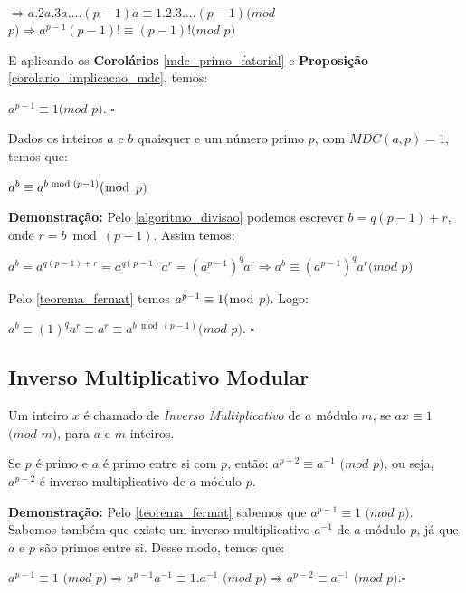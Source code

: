 $\Rightarrow a.2a.3a....(p-1)a \equiv 1.2.3....(p-1) (mod$ $p) \Rightarrow a^{p-1}(p-1)! \equiv (p-1)! (mod$ $p)$

E aplicando os \textbf{Corolários} \autoref{mdc_primo_fatorial} e \textbf{Proposição} \autoref{corolario_implicacao_mdc}, temos:

$a^{p-1}\equiv 1(mod$ $p)$. $\square$
\\


\begin{theorem}\label{teorema_fermat_expansao}
Dados os inteiros $a$ e $b$ quaisquer e um número primo $p$, com $MDC(a, p) = 1$, temos que:

$a^{b} \equiv a^{b \bmod (p-1)} (\bmod$ $p)$
\end{theorem}
\textbf{Demonstração:}
Pelo \autoref{algoritmo_divisao} podemos escrever $b=q(p-1)+r$, onde $r=b\bmod(p-1)$. Assim temos:

$a^b = a^{q(p-1)+r} = a^{q(p-1)}a^r = (a^{p-1})^qa^r \Rightarrow a^b \equiv (a^{p-1})^qa^r (mod$ $p)$ 

Pelo \autoref{teorema_fermat} temos $a^{p-1} \equiv 1 (\bmod$ $p)$. Logo:

$a^b \equiv (1)^qa^r \equiv a^r \equiv a^{b \bmod (p-1)} (mod$ $p)$. $\square$
\\

\subsection{Inverso Multiplicativo Modular}

\begin{definition}
Um inteiro $x$ é chamado de \textit{Inverso Multiplicativo} de $a$ módulo $m$, se $ax\equiv1$ $(mod$ $m)$, para $a$ e $m$ inteiros.
\end{definition}


\begin{theorem}\label{inveso_multiplicativo_modular}
Se $p$ é primo e $a$ é primo entre si com $p$, então: $a^{p-2} \equiv a^{-1}$ $(mod$ $p)$, ou seja, $a^{p-2}$ é inverso multiplicativo
de $a$ módulo $p$.
\end{theorem}
\textbf{Demonstração:}
Pelo \autoref{teorema_fermat} sabemos que $a^{p-1}\equiv1$ $(mod$ $p)$. Sabemos também que existe um inverso multiplicativo $a^{-1}$
de $a$ módulo $p$, já que $a$ e $p$ são primos entre si. Desse modo, temos que:

$a^{p-1}\equiv1$ $(mod$ $p) \Rightarrow a^{p-1}a^{-1} \equiv 1.a^{-1}$ $(mod$ $p) \Rightarrow a^{p-2}\equiv a^{-1}$ $(mod$ $p)$.$\square$


